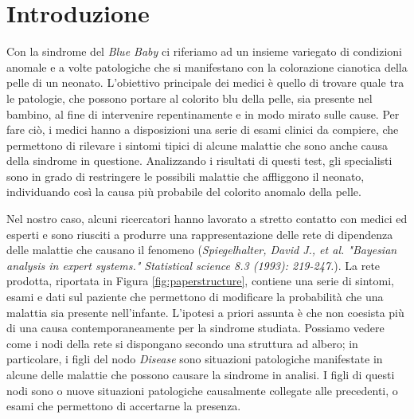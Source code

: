 \chapter{Introduzione}
Con la sindrome del \textit{Blue Baby} ci riferiamo ad un insieme variegato di condizioni anomale e a volte patologiche che si manifestano con la colorazione cianotica della pelle di un neonato.
L'obiettivo principale dei medici è quello di trovare quale tra le patologie, che possono portare al colorito blu della pelle, sia presente nel bambino, al fine di intervenire repentinamente e in modo mirato sulle cause. Per fare ciò, i medici hanno a disposizioni una serie di esami clinici da compiere, che permettono di rilevare i sintomi tipici di alcune malattie che sono anche causa della sindrome in questione. Analizzando i risultati di questi test, gli specialisti sono in grado di restringere le possibili malattie che affliggono il neonato, individuando così la causa più probabile del colorito anomalo della pelle.

Nel nostro caso, alcuni ricercatori hanno lavorato a stretto contatto con medici ed esperti e sono riusciti a produrre una rappresentazione delle rete di dipendenza delle malattie che causano il fenomeno (\textit{Spiegelhalter, David J., et al. "Bayesian analysis in expert systems." Statistical science 8.3 (1993): 219-247.}). La rete prodotta, riportata in Figura \ref{fig:paperstructure}, contiene una serie di sintomi, esami e dati sul paziente che permettono di modificare la probabilità che una malattia sia presente nell'infante. L'ipotesi a priori assunta è che non coesista più di una causa contemporaneamente per la sindrome studiata. Possiamo vedere come i nodi della rete si dispongano secondo una struttura ad albero; in particolare, i figli del nodo \textit{Disease} sono situazioni patologiche manifestate in alcune delle malattie che possono causare la sindrome in analisi. I figli di questi nodi sono o nuove situazioni patologiche causalmente collegate alle precedenti, o esami che permettono di accertarne la presenza.
 
